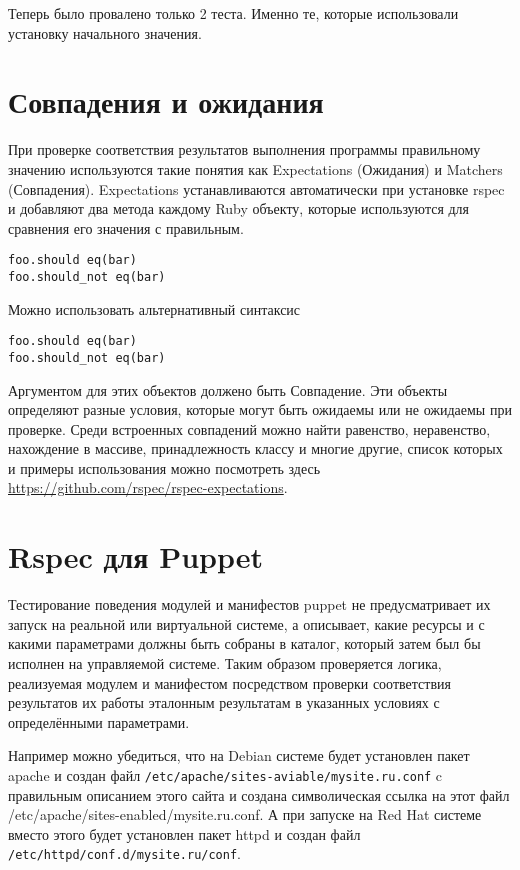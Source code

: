 Теперь было провалено только 2 теста. Именно те, которые использовали установку начального значения.

\section{Совпадения и ожидания}

При проверке соответствия результатов выполнения программы правильному значению используются такие понятия как Expectations (Ожидания) и Matchers (Совпадения). Expectations устанавливаются автоматически при установке rspec и добавляют два метода каждому Ruby объекту, которые используются для сравнения его значения с правильным.

\begin{verbatim}
foo.should eq(bar)
foo.should_not eq(bar)
\end{verbatim}

Можно использовать альтернативный синтаксис

\begin{verbatim}
foo.should eq(bar)
foo.should_not eq(bar)  
\end{verbatim}

Аргументом для этих объектов должено быть Совпадение. Эти объекты определяют разные условия, которые могут быть ожидаемы или не ожидаемы при проверке. Среди встроенных совпадений можно найти равенство, неравенство, нахождение в массиве, принадлежность классу и многие другие, список которых и примеры использования можно посмотреть здесь \url{https://github.com/rspec/rspec-expectations}.

\section{Rspec для Puppet}

Тестирование поведения модулей и манифестов puppet не предусматривает их запуск на реальной или виртуальной системе, а описывает, какие ресурсы и с какими параметрами должны быть собраны в каталог, который затем был бы исполнен на управляемой системе. Таким образом проверяется логика, реализуемая модулем и манифестом посредством проверки соответствия результатов их работы эталонным результатам в указанных условиях с определёнными параметрами.

Например можно убедиться, что на Debian системе будет установлен пакет apache и создан файл \texttt{/etc/apache/sites-aviable/mysite.ru.conf} c правильным описанием этого сайта и создана символическая ссылка на этот файл /etc/apache/sites-enabled/mysite.ru.conf. А при запуске на Red Hat системе вместо этого будет установлен пакет httpd и создан файл \texttt{/etc/httpd/conf.d/mysite.ru/conf}.

